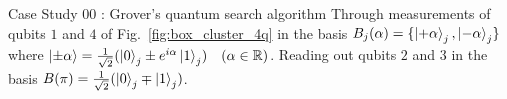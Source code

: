 \documentclass[final]{beamer}
\newlength{\colwidth}
\begin{document}
\begin{frame}[t]
\begin{columns}[t]
\begin{column}{\colwidth}
\begin{block}{Case Study 00 : Grover's quantum search algorithm}
                    Through measurements of qubits $1$ and $4$ of Fig.~\ref{fig:box_cluster_4q} in the
                    basis $B_j(\alpha) = \{\ket{+\alpha}_j, \ket{-\alpha}_j\}$
                    where $\ket{\pm \alpha} = \frac{1}{\sqrt{2}}(\ket{0}_j \pm
                    e^{i\alpha}\ket{1}_j) \quad (\alpha \in \mathbb{R})$. Reading out
                    qubits $2$ and $3$ in the basis $B(\pi) =
                    \frac{1}{\sqrt{2}}(\ket{0}_j \mp \ket{1}_j)$.


                    \begin{figure}[H]
                        \raggedright
                        \begin{minipage}[c]{0.40\textwidth}
\end{minipage}
\end{figure}
\end{block}
\end{column}
\end{columns}
\end{frame}
\end{document}
